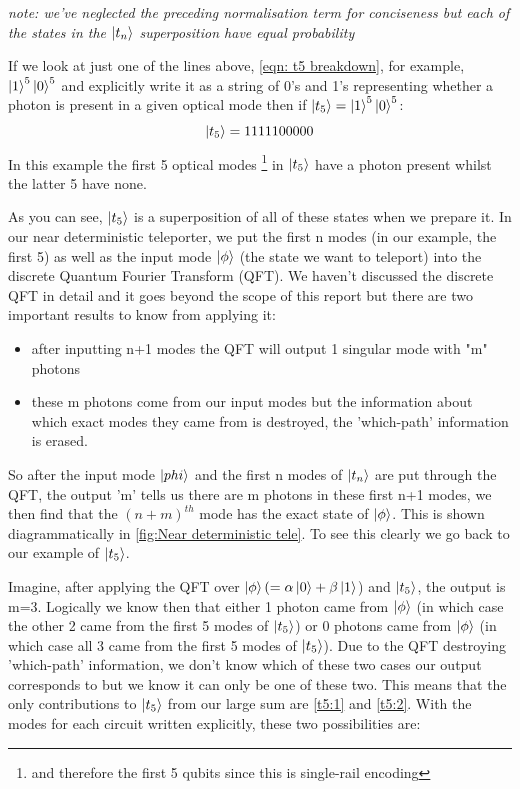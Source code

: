 \textit{note: we've neglected the preceding normalisation term for conciseness but each of the states in the $\ket{t_n}$ superposition have equal probability }
\par
If we look at just one of the lines above, \cref{eqn: t5 breakdown}, for example, $\ket{1}^5\ket{0}^5$ and explicitly write it as a string of 0's and 1's representing whether a photon is present in a given optical mode then if $\ket{t_5} = \ket{1}^5\ket{0}^5$:
    \begin{equation}
        \ket{t_5} = 1111100000
    \end{equation}
In this example the first 5 optical modes \footnote{and therefore the first 5 qubits since this is single-rail encoding} in $\ket{t_5}$ have a photon present whilst the latter 5 have none.
\par 
As you can see, $\ket{t_5}$ is a superposition of all of these states when we prepare it. In our near deterministic teleporter, we put the first n modes (in our example, the first 5) as well as the input mode $\ket{\phi}$ (the state we want to teleport) into the discrete Quantum Fourier Transform (QFT).  We haven't discussed the discrete QFT in detail and it goes beyond the scope of this report but there are two important results to know from applying it:
\begin{itemize}
    \item after inputting n+1 modes the QFT will output 1 singular mode with "m" photons
    \item these m photons come from our input modes but the information about which exact modes they came from is destroyed, the 'which-path' information is erased.
\end{itemize}
So after the input mode $\ket{phi}$ and the first n modes of $\ket{t_n}$ are put through the QFT, the output 'm' tells us there are m photons in these first n+1 modes, we then find that the $(n+m)^{th}$ mode has the exact state of $\ket{\phi}$. This is shown diagrammatically in \cref{fig:Near deterministic tele}. To see this clearly we go back to our example of $\ket{t_5}$.
\par
Imagine, after applying the QFT over $\ket{\phi} (= \alpha\ket{0} + \beta\ket{1}$) and $\ket{t_5}$, the output is m=3. Logically we know then that either 1 photon came from $\ket{\phi}$ (in which case the other 2 came from the first 5 modes of $\ket{t_5}$) or 0 photons came from $\ket{\phi}$ (in which case all 3 came from the first 5 modes of $\ket{t_5}$). Due to the QFT destroying 'which-path' information, we don't know which of these two cases our output corresponds to but we know it can only be one of these two. This means that the only contributions to $\ket{t_5}$ from our large sum are \cref{t5:1} and \cref{t5:2}. With the modes for each circuit written explicitly, these two possibilities are:
